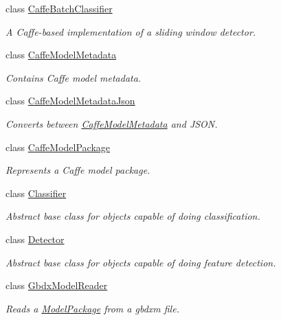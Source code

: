 \begin{DoxyCompactItemize}
\item 
class \hyperlink{classdg_1_1deepcore_1_1classification_1_1_caffe_batch_classifier}{Caffe\+Batch\+Classifier}
\begin{DoxyCompactList}\small\item\em A Caffe-\/based implementation of a sliding window detector. \end{DoxyCompactList}\item 
class \hyperlink{structdg_1_1deepcore_1_1classification_1_1_caffe_model_metadata}{Caffe\+Model\+Metadata}
\begin{DoxyCompactList}\small\item\em Contains Caffe model metadata. \end{DoxyCompactList}\item 
class \hyperlink{classdg_1_1deepcore_1_1classification_1_1_caffe_model_metadata_json}{Caffe\+Model\+Metadata\+Json}
\begin{DoxyCompactList}\small\item\em Converts between \hyperlink{structdg_1_1deepcore_1_1classification_1_1_caffe_model_metadata}{Caffe\+Model\+Metadata} and J\+S\+ON. \end{DoxyCompactList}\item 
class \hyperlink{classdg_1_1deepcore_1_1classification_1_1_caffe_model_package}{Caffe\+Model\+Package}
\begin{DoxyCompactList}\small\item\em Represents a Caffe model package. \end{DoxyCompactList}\item 
class \hyperlink{classdg_1_1deepcore_1_1classification_1_1_classifier}{Classifier}
\begin{DoxyCompactList}\small\item\em Abstract base class for objects capable of doing classification. \end{DoxyCompactList}\item 
class \hyperlink{classdg_1_1deepcore_1_1classification_1_1_detector}{Detector}
\begin{DoxyCompactList}\small\item\em Abstract base class for objects capable of doing feature detection. \end{DoxyCompactList}\item 
class \hyperlink{classdg_1_1deepcore_1_1classification_1_1_gbdx_model_reader}{Gbdx\+Model\+Reader}
\begin{DoxyCompactList}\small\item\em Reads a \hyperlink{classdg_1_1deepcore_1_1classification_1_1_model_package}{Model\+Package} from a gbdxm file. \end{DoxyCompactList}\item 

\end{DoxyCompactItemize}
